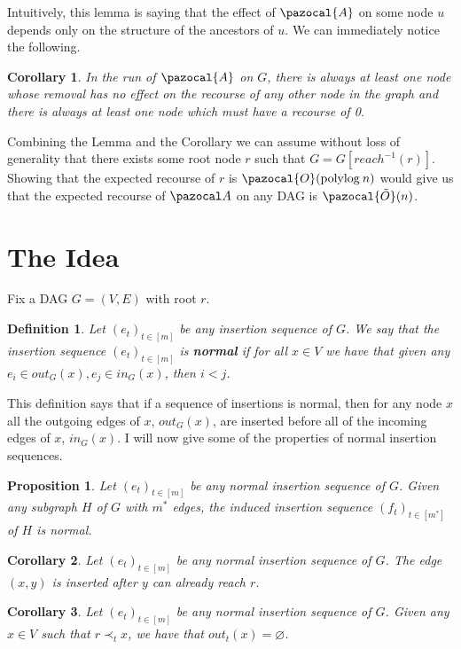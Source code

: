 \documentclass{article}
\newtheorem{corollary}{Corollary}
\newtheorem{proposition}{Proposition}
\newtheorem{definition}{Definition}
\begin{document}
Intuitively, this lemma is saying that the effect of $\pazocal{A}$ on some node $u$ depends only on the structure of the ancestors of $u$. We can immediately notice the following.

\begin{corollary}
In the run of $\pazocal{A}$ on $G$, there is always at least one node whose removal has no effect on the recourse of any other node in the graph and there is always at least one node which must have a recourse of 0.
\end{corollary}

Combining the Lemma and the Corollary we can assume without loss of generality that there exists some root node $r$ such that $G = G[reach^{-1}(r)]$. Showing that the expected recourse of $r$ is $\pazocal{O}(\textrm{polylog} \: n)$ would give us that the expected recourse of $\pazocal A$ on any DAG is $\pazocal{\tilde O}(n)$. 

\section{The Idea}

Fix a DAG $G=(V,E)$ with root $r$.

\begin{definition}
Let $(e_t)_{t \in [m]}$ be any insertion sequence of $G$. We say that the insertion sequence $(e_t)_{t \in [m]}$ is \textbf{normal} if for all $x \in V$ we have that given any $e_i \in out_G(x), e_j \in in_G(x)$, then $i < j$.
\end{definition}

This definition says that if a sequence of insertions is normal, then for any node $x$ all the outgoing edges of $x$, $out_G(x)$, are inserted before all of the incoming edges of $x$, $in_G(x)$. I will now give some of the properties of normal insertion sequences. 

\begin{proposition}
Let $(e_t)_{t \in [m]}$ be any normal insertion sequence of $G$. Given any subgraph $H$ of $G$ with $m^*$ edges, the induced insertion sequence  $(f_t)_{t \in [m^*]}$ of $H$ is normal.
\end{proposition}

\begin{corollary}
Let $(e_t)_{t \in [m]}$ be any normal insertion sequence of $G$. The edge $(x,y)$ is inserted after $y$ can already reach $r$.
\end{corollary}

\begin{corollary}
Let $(e_t)_{t \in [m]}$ be any normal insertion sequence of $G$. Given any $x \in V$ such that $r \prec_t x$, we have that $out_t(x) = \varnothing$.
\end{corollary}
\end{document}
